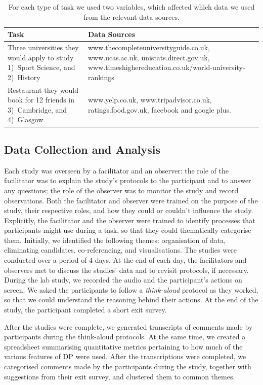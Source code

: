 \documentclass{sigchi}
\begin{document}
\begin{table}[htbp]
\begin{center}
\small
\begin{tabular}{|p{3cm}|p{4.7cm}|}
\hline
Task	 & Data Sources\\
\hline
Three universities they would apply to study 1)~Sport Science, and 2)~History & www.thecompleteuniversityguide.co.uk, www.ucas.ac.uk, unistats.direct.gov.uk, www.timeshighereducation.co.uk/world-university-rankings\\
\hline
Restaurant they would book for 12 friends in 3)~Cambridge, and 4)~Glasgow & www.yelp.co.uk, www.tripadvisor.co.uk, ratings.food.gov.uk, facebook and google plus.\\
\hline
\end{tabular}
\end{center}
\caption{For each type of task we used two variables, which affected which data we used from the relevant data sources.} \label{tab:studyfactors}
\normalsize
\end{table}

\subsection{Data Collection and Analysis}
Each study was overseen by a facilitator and an observer: the role of the facilitator was to explain the study's protocols to the participant and to answer any questions; the role of the observer was to monitor the study and record observations.  Both the facilitator and observer were trained on the purpose of the study, their respective roles, and how they could or couldn't influence the study.   Explicitly, the facilitator and the observer were trained to identify processes that participants might use during a task, so that they could thematically categorise them.  Initially, we identified the following themes: organisation of data, eliminating candidates, co-referencing, and visualisations. The studies were conducted over a period of 4 days.  At the end of each day, the facilitators and observers met to discuss the studies' data and to revisit protocols, if necessary.  During the lab study, we recorded the audio and the participant's actions on screen. We asked the participants to follow a \emph{think-aloud} protocol as they worked, so that we could understand the reasoning behind their actions.  At the end of the study, the participant completed a short exit survey.

After the studies were complete, we generated transcripts of comments made by participants during the think-aloud protocols. At the same time, we created a spreadsheet summarising quantitative metrics pertaining to how much of the various features of DP were used.  After the transcriptions were completed, we categorised comments made by the participants during the study, together with suggestions from their exit survey, and clustered them to common themes.
\end{document}
